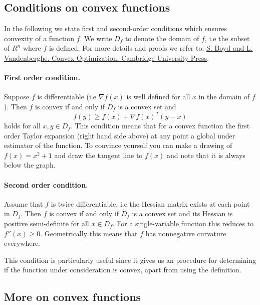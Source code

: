 \documentclass[%
oneside,                 %
final,                   %
10pt]{article}
\begin{document}
\subsection*{Conditions on convex functions}

In the following we state first and second-order conditions which
ensures convexity of a function $f$. We write $D_f$ to denote the
domain of $f$, i.e the subset of $R^n$ where $f$ is defined. For more
details and proofs we refer to: \href{{http://stanford.edu/boyd/cvxbook/, 2004}}{S. Boyd and L. Vandenberghe. Convex Optimization. Cambridge University Press}.


\paragraph{First order condition.}
Suppose $f$ is differentiable (i.e $\nabla f(x)$ is well defined for
all $x$ in the domain of $f$). Then $f$ is convex if and only if $D_f$
is a convex set and $$f(y) \geq f(x) + \nabla f(x)^T (y-x) $$ holds
for all $x,y \in D_f$. This condition means that for a convex function
the first order Taylor expansion (right hand side above) at any point
a global under estimator of the function. To convince yourself you can
make a drawing of $f(x) = x^2+1$ and draw the tangent line to $f(x)$ and
note that it is always below the graph.




\paragraph{Second order condition.}
Assume that $f$ is twice
differentiable, i.e the Hessian matrix exists at each point in
$D_f$. Then $f$ is convex if and only if $D_f$ is a convex set and its
Hessian is positive semi-definite for all $x\in D_f$. For a
single-variable function this reduces to $f''(x) \geq 0$. Geometrically this means that $f$ has nonnegative curvature
everywhere.



This condition is particularly useful since it gives us an procedure for determining if the function under consideration is convex, apart from using the definition.

\subsection*{More on convex functions}
\end{document}
